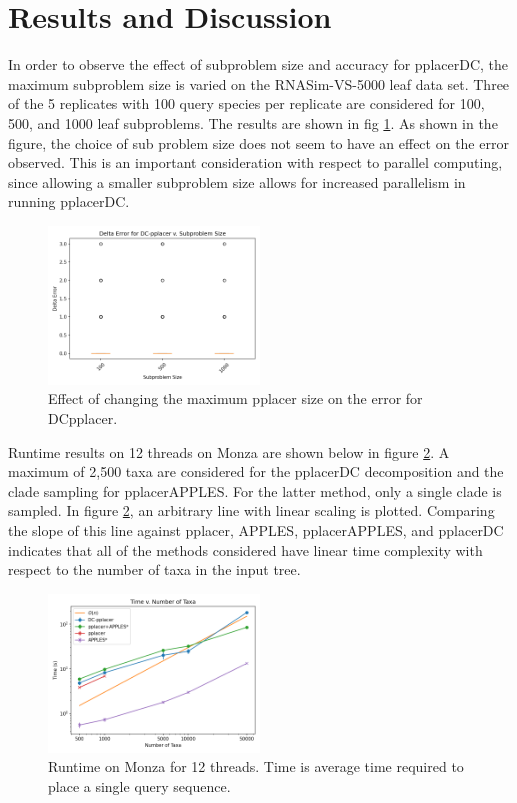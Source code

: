 \documentclass[10pt]{article}
\begin{document}
\section{Results and Discussion}

In order to observe the effect of subproblem size and accuracy for pplacerDC,
the maximum subproblem size is varied on the RNASim-VS-5000 leaf data set.
Three of the 5 replicates with 100 query species per replicate are
considered for 100, 500, and 1000 leaf subproblems.
The results are shown in fig \ref{fig:varying-size}.
As shown in the figure, the choice of sub problem size does not seem
to have an effect on the error observed.
This is an important consideration with respect to parallel computing,
since allowing a smaller subproblem size allows
for increased parallelism in running pplacerDC.
\begin{figure}
\centering
\includegraphics[width=0.5\textwidth]{Figs/varying-subproblem-size.png}
\caption{Effect of changing the maximum pplacer size on the error for DCpplacer.}
\label{fig:varying-size}
\end{figure}
Runtime results on 12 threads on Monza are shown below in figure \ref{fig:timing-results}.
A maximum of 2,500 taxa are considered for the pplacerDC decomposition and the clade
sampling for pplacerAPPLES.
For the latter method, only a single clade is sampled.
In figure \ref{fig:timing-results}, an arbitrary line with linear scaling is plotted.
Comparing the slope of this line against pplacer, APPLES, pplacerAPPLES, and pplacerDC
indicates that all of the methods considered have linear time complexity with respect
to the number of taxa in the input tree.
\begin{figure}
\centering
\includegraphics[width=0.5\textwidth]{Figs/VS-timing-results.png}
\caption{Runtime on Monza for 12 threads. Time is average time required to place a single query sequence.}
\label{fig:timing-results}
\end{figure}
\end{document}
